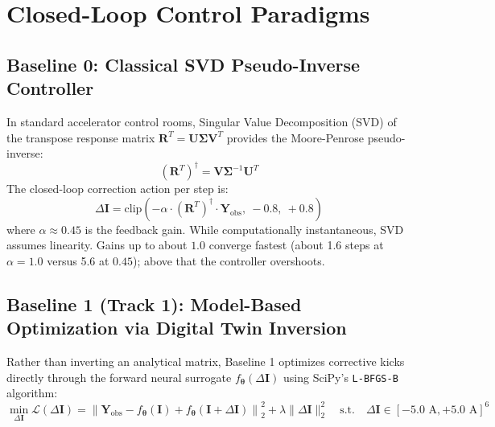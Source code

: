 \documentclass[11pt,a4paper]{article}
\begin{document}
\section{Closed-Loop Control Paradigms}

\subsection{Baseline 0: Classical SVD Pseudo-Inverse Controller}
In standard accelerator control rooms, Singular Value Decomposition (SVD) of the transpose response matrix $\mathbf{R}^T = \mathbf{U} \boldsymbol{\Sigma} \mathbf{V}^T$ provides the Moore-Penrose pseudo-inverse:
\begin{equation}
    (\mathbf{R}^T)^\dagger = \mathbf{V} \boldsymbol{\Sigma}^{-1} \mathbf{U}^T
\end{equation}
The closed-loop correction action per step is:
\begin{equation}
    \Delta \mathbf{I} = \text{clip}\left( - \alpha \cdot (\mathbf{R}^T)^\dagger \cdot \mathbf{Y}_{\text{obs}}, \ -0.8, \ +0.8 \right)
\end{equation}
where $\alpha \approx 0.45$ is the feedback gain.
While computationally instantaneous, SVD assumes linearity. Gains up to about $1.0$ converge fastest (about 1.6 steps at $\alpha = 1.0$ versus 5.6 at $0.45$); above that the controller overshoots.

\subsection{Baseline 1 (Track 1): Model-Based Optimization via Digital Twin Inversion}
Rather than inverting an analytical matrix, Baseline 1 optimizes corrective kicks directly through the forward neural surrogate $f_{\boldsymbol{\theta}}(\Delta \mathbf{I})$ using SciPy's \texttt{L-BFGS-B} algorithm:
\begin{equation}
    \min_{\Delta \mathbf{I}} \mathcal{L}(\Delta \mathbf{I}) = \left\| \mathbf{Y}_{\text{obs}} - f_{\boldsymbol{\theta}}(\mathbf{I}) + f_{\boldsymbol{\theta}}(\mathbf{I} + \Delta \mathbf{I}) \right\|_2^2 + \lambda \|\Delta \mathbf{I}\|_2^2 \quad \text{s.t.} \quad \Delta \mathbf{I} \in [-5.0\text{ A}, +5.0\text{ A}]^6
\end{equation}
\end{document}
